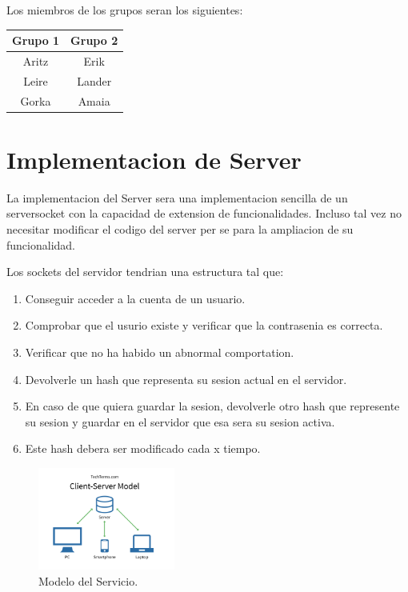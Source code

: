 \documentclass{article}
\theoremstyle{definition}
\begin{document}
Los miembros de los grupos seran los siguientes:

\begin{center}
\begin{tabular}{|c|c|}
    \hline
    Grupo 1  & Grupo 2 \\
    \hline
    Aritz & Erik \\
    Leire & Lander \\
    Gorka & Amaia \\
    \hline
\end{tabular}
\end{center}




\section{Implementacion de Server}


La implementacion del Server sera una implementacion sencilla de un serversocket con la capacidad de extension de funcionalidades. Incluso tal vez no necesitar modificar el codigo del server per se para la ampliacion de su funcionalidad. 

Los sockets del servidor tendrian una estructura tal que:
\begin{enumerate}
    \item Conseguir acceder a la cuenta de un usuario.
    \item Comprobar que el usurio existe y verificar que la contrasenia es correcta.
    \item Verificar que no ha habido un abnormal comportation.
    \item Devolverle un hash que representa su sesion actual en el servidor.
    \item En caso de que quiera guardar la sesion, devolverle otro hash que represente su sesion y guardar en el servidor que esa sera su sesion activa.
    \item Este hash debera ser modificado cada x tiempo.
\end{enumerate}

\begin{figure}
\centering
\includegraphics[width=0.4\textwidth]{pics/serverclient.png}
\caption{Modelo del Servicio.}
\end{figure} 
\end{document}
